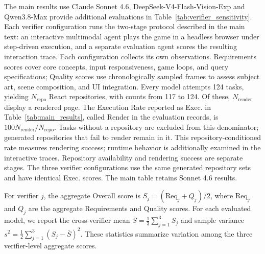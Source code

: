 \documentclass{article}
\begin{document}
The main results use Claude Sonnet 4.6, DeepSeek-V4-Flash-Vision-Exp and Qwen3.8-Max provide additional evaluations in Table~\ref{tab:verifier_sensitivity}. Each verifier configuration runs the two-stage protocol described in the main text: an interactive multimodal agent plays the game in a headless browser under step-driven execution, and a separate evaluation agent scores the resulting interaction trace. Each configuration collects its own observations. Requirements scores cover core concepts, input responsiveness, game loops, and query specifications; Quality scores use chronologically sampled frames to assess subject art, scene composition, and UI integration. Every model attempts 124 tasks, yielding $N_{\mathrm{repo}}$ React repositories, with counts from 117 to 124. Of these, $N_{\mathrm{render}}$ display a rendered page. The Execution Rate reported as Exec. in Table~\ref{tab:main_results}, called Render in the evaluation records, is $100N_{\mathrm{render}}/N_{\mathrm{repo}}$. Tasks without a repository are excluded from this denominator; generated repositories that fail to render remain in it. This repository-conditioned rate measures rendering success; runtime behavior is additionally examined in the interactive traces. Repository availability and rendering success are separate stages. The three verifier configurations use the same generated repository sets and have identical Exec. scores. The main table retains Sonnet 4.6 results.

For verifier $j$, the aggregate Overall score is $S_j=(\mathrm{Req}_j+Q_j)/2$, where $\mathrm{Req}_j$ and $Q_j$ are the aggregate Requirements and Quality scores. For each evaluated model, we report the cross-verifier mean $\bar{S}=\frac{1}{3}\sum_{j=1}^{3}S_j$ and sample variance $s^2=\frac{1}{2}\sum_{j=1}^{3}(S_j-\bar{S})^2$. These statistics summarize variation among the three verifier-level aggregate scores.
\end{document}
